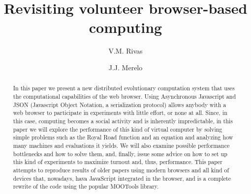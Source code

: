 \documentclass{llncs}
\begin{document}

\title{Revisiting volunteer browser-based computing}

\author{V.M. Rivas  \and J.J. Merelo }
\maketitle

\begin{abstract}
In this paper we present a new distributed
 evolutionary computation system that uses the computational capabilities of the
 web browser. Using 
Asynchronous Javascript and JSON (Javascript Object Notation, a
 serialization protocol) allows anybody with a web browser to participate in experiments with little effort, or none at all. Since, in
this case, computing becomes a social activity and is inherently
impredictable, in this
 paper we will explore the performance of this kind of virtual
 computer by solving simple problems such as the
 Royal Road function and an equation and analyzing how many machines and evaluations
it yields. We will also examine possible performance bottlenecks
 and how to solve them, and, finally, issue some advice on how to set
 up this kind of experiments to maximize turnout and, thus,
 performance. This paper attempts to reproduce results of older papers
 using modern browsers and all kind of devices that, nowadays, hava
 JavaScript integrated in the browser, and is a complete rewrite of
 the code using the popular MOOTools library. %
\end{abstract}

\end{document}
